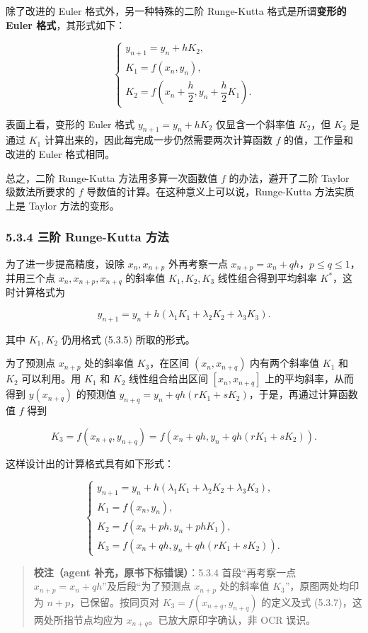 \documentclass[
  10pt,
  fontset=fandol]{ctexart}
\begin{document}
除了改进的 Euler 格式外，另一种特殊的二阶 Runge-Kutta 格式是所谓\textbf{变形的 Euler 格式}，其形式如下：

\[
\begin{cases}
y_{n+1}=y_n+hK_2,\\
K_1=f(x_n,y_n),\\
K_2=f\left(x_n+\dfrac{h}{2},y_n+\dfrac{h}{2}K_1\right).
\end{cases}
\]

表面上看，变形的 Euler 格式 \(y_{n+1}=y_n+hK_2\) 仅显含一个斜率值 \(K_2\)，但 \(K_2\) 是通过 \(K_1\) 计算出来的，因此每完成一步仍然需要两次计算函数 \(f\) 的值，工作量和改进的 Euler 格式相同。

总之，二阶 Runge-Kutta 方法用多算一次函数值 \(f\) 的办法，避开了二阶 Taylor 级数法所要求的 \(f\) 导数值的计算。在这种意义上可以说，Runge-Kutta 方法实质上是 Taylor 方法的变形。

\subsubsection{5.3.4 三阶 Runge-Kutta 方法}\label{ux4e09ux9636-runge-kutta-ux65b9ux6cd5}

为了进一步提高精度，设除 \(x_n,x_{n+p}\) 外再考察一点 \(x_{n+p}=x_n+qh\)，\(p\leqslant q\leqslant1\)，并用三个点 \(x_n,x_{n+p},x_{n+q}\) 的斜率值 \(K_1,K_2,K_3\) 线性组合得到平均斜率 \(K^*\)，这时计算格式为

\[
y_{n+1}=y_n+h(\lambda_1K_1+\lambda_2K_2+\lambda_3K_3).
\]

其中 \(K_1,K_2\) 仍用格式 (5.3.5) 所取的形式。

为了预测点 \(x_{n+p}\) 处的斜率值 \(K_3\)，在区间 \((x_n,x_{n+q})\) 内有两个斜率值 \(K_1\) 和 \(K_2\) 可以利用。用 \(K_1\) 和 \(K_2\) 线性组合给出区间 \([x_n,x_{n+q}]\) 上的平均斜率，从而得到 \(y(x_{n+q})\) 的预测值 \(y_{n+q}=y_n+qh(rK_1+sK_2)\)，于是，再通过计算函数值 \(f\) 得到

\[
K_3=f(x_{n+q},y_{n+q})=f(x_n+qh,y_n+qh(rK_1+sK_2)).
\]

这样设计出的计算格式具有如下形式：

\[
\begin{cases}
y_{n+1}=y_n+h(\lambda_1K_1+\lambda_2K_2+\lambda_3K_3),\\
K_1=f(x_n,y_n),\\
K_2=f(x_n+ph,y_n+phK_1),\\
K_3=f(x_n+qh,y_n+qh(rK_1+sK_2)).
\end{cases}\tag{5.3.7}
\]

\begin{quote}
\textbf{校注（agent 补充，原书下标错误）}：5.3.4 首段``再考察一点 \(x_{n+p}=x_n+qh\)''及后段``为了预测点 \(x_{n+p}\) 处的斜率值 \(K_3\)''，原图两处均印为 \(n+p\)，已保留。按同页对 \(K_3=f(x_{n+q},y_{n+q})\) 的定义及式 (5.3.7)，这两处所指节点均应为 \(x_{n+q}\)。已放大原印字确认，非 OCR 误识。
\end{quote}
\end{document}
